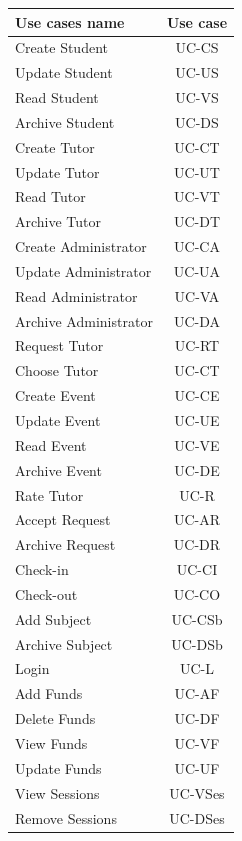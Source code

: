 \documentclass[12pt]{article}
\begin{document}
\begin{tabular}{| l | c |}

\hline

\textbf{Use cases name} & \textbf{Use case}	\\ \hline		
			Create Student				&	UC-CS
			\\Update Student 			&	UC-US
			\\Read Student      		&	UC-VS
			\\Archive Student		&		UC-DS
			\\Create Tutor			&		UC-CT
			\\Update Tutor			&		UC-UT
			\\Read Tutor				&	UC-VT
			\\Archive Tutor			&		UC-DT
			\\Create Administrator	& UC-CA %
			\\Update Administrator 	&			UC-UA %
			\\Read Administrator      &			UC-VA %
			\\Archive Administrator	&			UC-DA %
			\\Request Tutor			&		UC-RT
			\\Choose Tutor			&		UC-CT
			\\Create Event			&		UC-CE %
			\\Update Event			&		UC-UE %
			\\Read Event				&	UC-VE %
			\\Archive Event			&		UC-DE %
			\\Rate Tutor				&	UC-R
			\\Accept Request			&	UC-AR
			\\Archive Request		&		UC-DR
			\\Check-in				&		UC-CI
			\\Check-out				&		UC-CO
			\\Add Subject			&		UC-CSb %
			\\Archive Subject		&		UC-DSb
			\\Login					&		UC-L
			\\Add Funds				&		UC-AF
			\\Delete Funds			&		UC-DF
			\\View Funds				&		UC-VF
			\\Update Funds			& 		UC-UF
			\\View Sessions			&		UC-VSes
			\\Remove Sessions		&       UC-DSes
			\\ \hline
\end{tabular}
\end{document}
